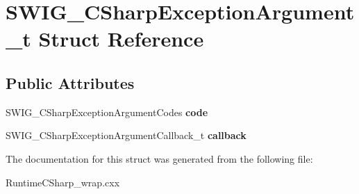 \hypertarget{struct_s_w_i_g___c_sharp_exception_argument__t}{}\section{S\+W\+I\+G\+\_\+\+C\+Sharp\+Exception\+Argument\+\_\+t Struct Reference}
\label{struct_s_w_i_g___c_sharp_exception_argument__t}
\subsection*{Public Attributes}
\begin{DoxyCompactItemize}
\item 
S\+W\+I\+G\+\_\+\+C\+Sharp\+Exception\+Argument\+Codes {\bfseries code}\hypertarget{struct_s_w_i_g___c_sharp_exception_argument__t_a8c87eccaa5242cbf10a00e9571fc9208}{}\label{struct_s_w_i_g___c_sharp_exception_argument__t_a8c87eccaa5242cbf10a00e9571fc9208}

\item 
S\+W\+I\+G\+\_\+\+C\+Sharp\+Exception\+Argument\+Callback\+\_\+t {\bfseries callback}\hypertarget{struct_s_w_i_g___c_sharp_exception_argument__t_a1ce5e3abc49f6350a17b9fcfd990b321}{}\label{struct_s_w_i_g___c_sharp_exception_argument__t_a1ce5e3abc49f6350a17b9fcfd990b321}

\end{DoxyCompactItemize}


The documentation for this struct was generated from the following file\+:\begin{DoxyCompactItemize}
\item 
Runtime\+C\+Sharp\+\_\+wrap.\+cxx\end{DoxyCompactItemize}
